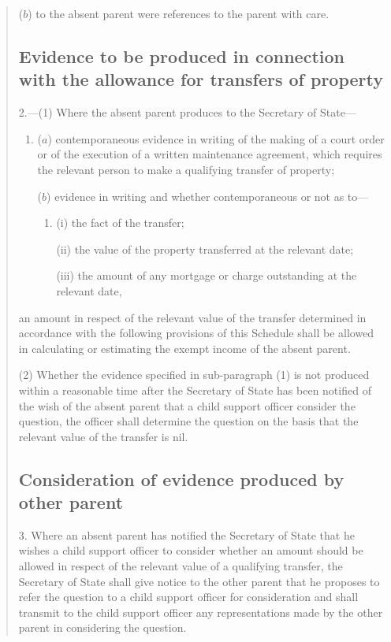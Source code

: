 \documentclass[a4paper]{article}
\begin{document}
\begin{quotation}
\begin{enumerate}
($b$) to the absent parent were references to the parent with care.
\end{enumerate}

\subsection*{\sloppy Evidence to be produced in connection with the allowance for transfers of property}

2.—(1) Where the absent parent produces to the Secretary of State—
\begin{enumerate}\item[]
($a$) contemporaneous evidence in writing of the making of a court order or of the execution of a written maintenance agreement, which requires the relevant person to make a qualifying transfer of property;

($b$) evidence in writing and whether contemporaneous or not as to—
\begin{enumerate}\item[]
(i) the fact of the transfer;

(ii) the value of the property transferred at the relevant date;

(iii) the amount of any mortgage or charge outstanding at the relevant date,
\end{enumerate}
\end{enumerate}
an amount in respect of the relevant value of the transfer determined in accordance with the following provisions of this Schedule shall be allowed in calculating or estimating the exempt income of the absent parent.

(2) Whether the evidence specified in sub-paragraph (1) is not produced within a reasonable time after the Secretary of State has been notified of the wish of the absent parent that a child support officer consider the question, the officer shall determine the question on the basis that the relevant value of the transfer is nil.

\subsection*{Consideration of evidence produced by other parent}

3.  Where an absent parent has notified the Secretary of State that he wishes a child support officer to consider whether an amount should be allowed in respect of the relevant value of a qualifying transfer, the Secretary of State shall give notice to the other parent that he proposes to refer the question to a child support officer for consideration and shall transmit to the child support officer any representations made by the other parent in considering the question.


\end{quotation}
\end{document}
